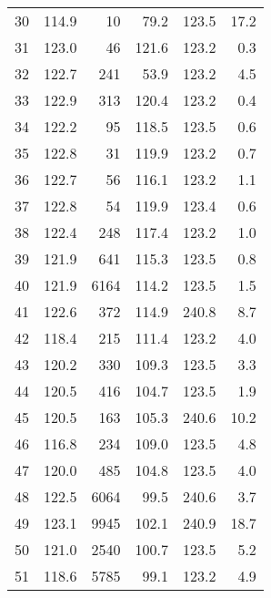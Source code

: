 \begin{tabular}{|r|r|r|r|r|r|}
30 &  114.9 & 10 & 79.2 & 123.5 & 17.2\\
31 &  123.0 & 46 & 121.6 & 123.2 & 0.3\\
32 &  122.7 & 241 & 53.9 & 123.2 & 4.5\\
33 &  122.9 & 313 & 120.4 & 123.2 & 0.4\\
34 &  122.2 & 95 & 118.5 & 123.5 & 0.6\\
35 &  122.8 & 31 & 119.9 & 123.2 & 0.7\\
36 &  122.7 & 56 & 116.1 & 123.2 & 1.1\\
37 &  122.8 & 54 & 119.9 & 123.4 & 0.6\\
38 &  122.4 & 248 & 117.4 & 123.2 & 1.0\\
39 &  121.9 & 641 & 115.3 & 123.5 & 0.8\\
40 &  121.9 & 6164 & 114.2 & 123.5 & 1.5\\
41 &  122.6 & 372 & 114.9 & 240.8 & 8.7\\
42 &  118.4 & 215 & 111.4 & 123.2 & 4.0\\
43 &  120.2 & 330 & 109.3 & 123.5 & 3.3\\
44 &  120.5 & 416 & 104.7 & 123.5 & 1.9\\
45 &  120.5 & 163 & 105.3 & 240.6 & 10.2\\
46 &  116.8 & 234 & 109.0 & 123.5 & 4.8\\
47 &  120.0 & 485 & 104.8 & 123.5 & 4.0\\
48 &  122.5 & 6064 & 99.5 & 240.6 & 3.7\\
49 &  123.1 & 9945 & 102.1 & 240.9 & 18.7\\
50 &  121.0 & 2540 & 100.7 & 123.5 & 5.2\\
51 &  118.6 & 5785 & 99.1 & 123.2 & 4.9\\
\hline
\end{tabular}
